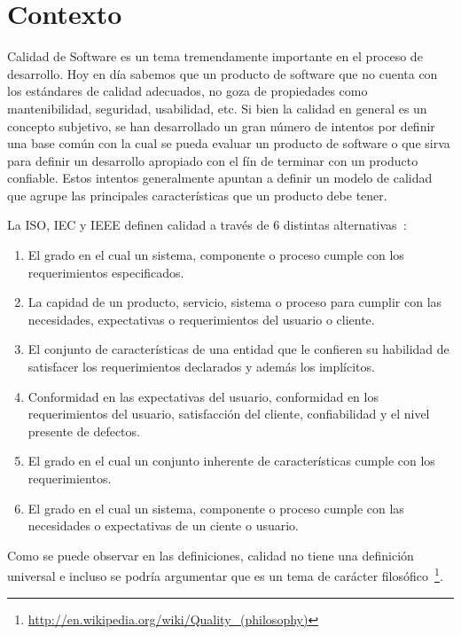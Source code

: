 
\section{Contexto}


Calidad de Software es un tema tremendamente importante en el proceso de desarrollo.
Hoy en día sabemos que un producto de software que no cuenta con los estándares de
calidad adecuados, no goza de propiedades como mantenibilidad, seguridad, usabilidad, etc.
Si bien la calidad en general es un concepto subjetivo, se han desarrollado un gran
número de intentos por definir una base común con la cual se pueda evaluar un producto 
de software o que sirva para definir un desarrollo apropiado con el fín de terminar
con un producto confiable. Estos intentos generalmente apuntan a definir un modelo
de calidad que agrupe las principales características que un producto debe tener.

La ISO, IEC y IEEE definen calidad a través de 6 distintas alternativas~\cite{5276043}:
\begin{enumerate}
    \item El grado en el cual un sistema, componente o proceso cumple con los requerimientos especificados.
    \item La capidad de un producto, servicio, sistema o proceso para cumplir con las necesidades, expectativas
    o requerimientos del usuario o cliente.
    \item El conjunto de características de una entidad que le confieren su habilidad de satisfacer los requerimientos
    declarados y además los implícitos.
    \item Conformidad en las expectativas del usuario, conformidad en los requerimientos del usuario, satisfacción del cliente,
    confiabilidad y el nivel presente de defectos.
    \item El grado en el cual un conjunto inherente de características cumple con los requerimientos.
    \item El grado en el cual un sistema, componente o proceso cumple con las necesidades o expectativas de un ciente o usuario.
\end{enumerate}

Como se puede observar en las definiciones, calidad no tiene una definición universal e incluso se podría argumentar
que es un tema de carácter filosófico~\footnote{\url{http://en.wikipedia.org/wiki/Quality_(philosophy)}}.


